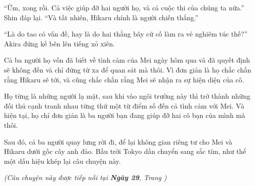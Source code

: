 {``Ừm, xong rồi. Cả việc giúp đỡ hai người họ, và cả cuộc thi của chúng
ta nữa.'' Shin đáp lại. ``Và tất nhiên, Hikaru chính là người chiến
thắng.''

``Là do tao có vấn đề, hay là do hai thằng bây cứ cố làm ra vẻ nghiêm
túc thế?'' Akira đứng kế bên lên tiếng xỏ xiên.

Cả ba người họ vốn đã biết về tình cảm của Mei ngày hôm qua và đã quyết
định sẽ không đến và chỉ đứng từ xa để quan sát mà thôi. Vì đơn giản là
họ chắc chắn rằng Hikaru sẽ tới, và cũng chắc chắn rằng Mei sẽ nhận ra
sự hiện diện của cô.

Họ từng là những người lạ mặt, sau khi vào ngôi trường này thì trở thành
những đối thủ cạnh tranh nhau từng thứ một từ điểm số đến cả tình cảm
với Mei. Và hiện tại, họ chỉ đơn giản là ba người bạn đang giúp đỡ hai
cô bạn của mình mà thôi.

Sau đó, cả ba người quay lưng rời đi, để lại không gian riêng tư cho Mei
và Hikaru dưới gốc cây anh đào. Bầu trời Tokyo dần chuyển sang sắc tím,
như thể một dấu hiệu khép lại câu chuyện này.

\vspace{1cm}
\begin{flushright}
    \small\itshape\textcolor{bunko_gray}{
        (Câu chuyện này được tiếp nối tại \textbf{Ngày 29}, Trang \pageref{chap:ngay_29})
    }
\end{flushright}
}
